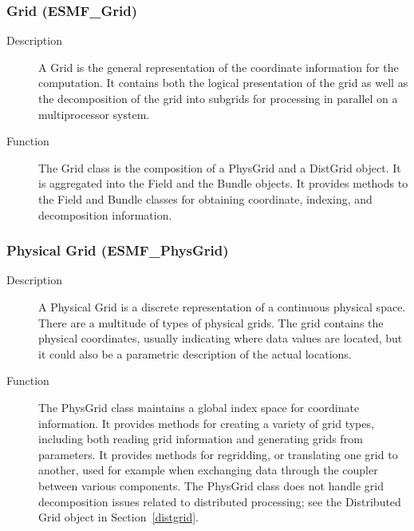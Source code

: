 \subsubsection{Grid (ESMF\_Grid)}
\label{sec:grid} 
\begin{description}
\item [Description] A Grid is the general representation of the coordinate information for
the computation.  It contains both the logical presentation of the grid as well as the
decomposition of the grid into subgrids for processing in parallel on a
multiprocessor system.
\item [Function] The Grid class is the composition of a PhysGrid and a DistGrid object.  
It is aggregated into the Field and the Bundle objects.  It provides methods to the
Field and Bundle classes for obtaining coordinate, indexing, and decomposition information.
\end{description}

\subsubsection{Physical Grid (ESMF\_PhysGrid)}
\label{sec:physgrid} 
\begin{description}
\item [Description] A Physical Grid is a discrete representation of a continuous physical space.
There are a multitude of types of physical grids.
The grid contains the physical coordinates, usually indicating where data values are located, but
it could also be a parametric description of the actual locations.  
\item [Function] The PhysGrid class maintains a global index space for coordinate information.
It provides methods for creating a variety of grid types, including both reading grid information
and generating grids from parameters.  It provides methods for regridding, or translating
one grid to another, used for example when exchanging data through the coupler between
various components.
The PhysGrid class does not handle grid decomposition issues related to 
distributed processing; see the Distributed Grid object in Section~\ref{distgrid}.
\end{description}

